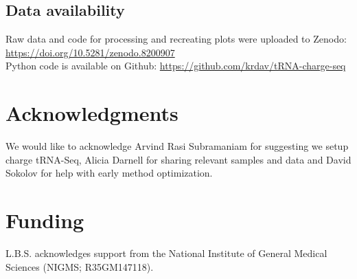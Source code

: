 \documentclass[9pt,lineno]{elife}
\begin{document}
\subsection{Data availability}
Raw data and code for processing and recreating plots were uploaded to Zenodo:
\url{https://doi.org/10.5281/zenodo.8200907}\\
Python code is available on Github:
\url{https://github.com/krdav/tRNA-charge-seq}



\section{Acknowledgments}
We would like to acknowledge Arvind Rasi Subramaniam for suggesting we setup charge tRNA-Seq, Alicia Darnell for sharing relevant samples and data and David Sokolov for help with early method optimization.



\section{Funding}
L.B.S. acknowledges support from the National Institute of General Medical Sciences (NIGMS; R35GM147118).



\end{document}
